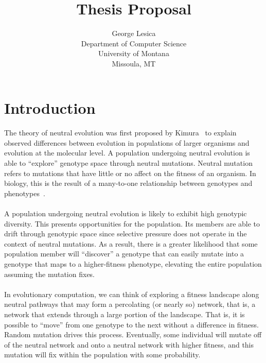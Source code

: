 \documentclass[12pt,letterpaper,titlepage,draft]{article}
\title{Thesis Proposal}
\author{George Lesica\\
Department of Computer Science\\
University of Montana\\
Missoula, MT}
\begin{document}
\maketitle

\section{Introduction}

\paragraph{}
The theory of neutral evolution was first proposed by Kimura~\cite{Kimura1984}
to explain observed differences between evolution in populations of larger
organisms and evolution at the molecular level. A population undergoing
neutral evolution is able to ``explore'' genotype space through neutral
mutations. Neutral mutation refers to mutations that have little or no affect
on the fitness of an organism. In biology, this is the result of a many-to-one
relationship between genotypes and phenotypes~\cite{Newman1998}.

\paragraph{}
A population undergoing neutral evolution is likely to exhibit high genotypic
diversity. This presents opportunities for the population. Its members are able
to drift through genotypic space since selective pressure does not operate in
the context of neutral mutations. As a result, there is a greater likelihood
that some population member will ``discover'' a genotype that can easily mutate
into a genotype that maps to a higher-fitness phenotype, elevating the entire
population assuming the mutation fixes.

\paragraph{}
In evolutionary computation, we can think of exploring a fitness landscape
along neutral pathways that may form a percolating (or nearly so) network, that
is, a network that extends through a large portion of the landscape. That is,
it is possible to ``move'' from one genotype to the next without a difference
in fitness.  Random mutation drives this process.  Eventually, some individual
will mutate off of the neutral network and onto a neutral network with higher
fitness, and this mutation will fix within the population with some
probability.
\end{document}
